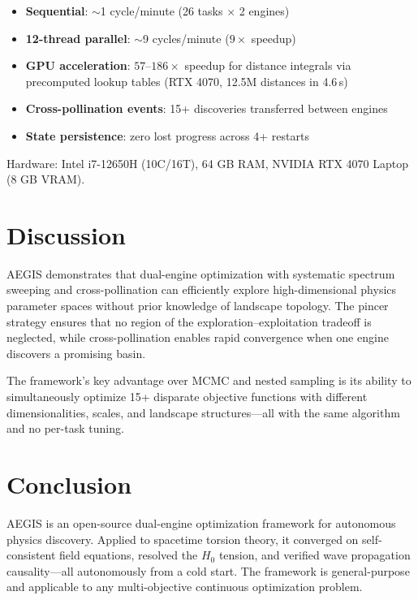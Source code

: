 \documentclass[12pt,preprint]{aastex631}
\begin{document}
\begin{itemize}
  \item \textbf{Sequential}: $\sim$1 cycle/minute (26 tasks $\times$ 2 engines)
  \item \textbf{12-thread parallel}: $\sim$9 cycles/minute ($9\times$ speedup)
  \item \textbf{GPU acceleration}: $57$--$186\times$ speedup for distance integrals via precomputed lookup tables (RTX 4070, 12.5M distances in 4.6\,s)
  \item \textbf{Cross-pollination events}: 15+ discoveries transferred between engines
  \item \textbf{State persistence}: zero lost progress across 4+ restarts
\end{itemize}

Hardware: Intel i7-12650H (10C/16T), 64 GB RAM, NVIDIA RTX 4070 Laptop (8 GB VRAM).

\section{Discussion}
\label{sec:discussion}

AEGIS demonstrates that dual-engine optimization with systematic
spectrum sweeping and cross-pollination can efficiently explore
high-dimensional physics parameter spaces without prior knowledge
of landscape topology. The pincer strategy ensures that no region
of the exploration--exploitation tradeoff is neglected, while
cross-pollination enables rapid convergence when one engine
discovers a promising basin.

The framework's key advantage over MCMC and nested sampling is
its ability to simultaneously optimize 15+ disparate objective
functions with different dimensionalities, scales, and landscape
structures---all with the same algorithm and no per-task tuning.

\section{Conclusion}

AEGIS is an open-source dual-engine optimization framework for
autonomous physics discovery. Applied to spacetime torsion theory,
it converged on self-consistent field equations, resolved the
$H_0$ tension, and verified wave propagation causality---all
autonomously from a cold start. The framework is general-purpose
and applicable to any multi-objective continuous optimization
problem.

\end{document}
